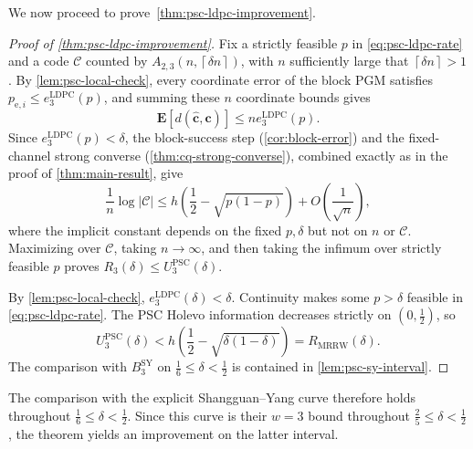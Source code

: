 \documentclass[11pt]{article}
\renewcommand{\leq}{\leqslant}
\theoremstyle{remark}
\newcommand{\cC}{\mathcal{C}}
\newcommand{\Eb}{\mathbf{E}}
\newcommand{\MRRW}{R_{\mathrm{MRRW}}}
\newcommand{\bchat}{\hat{\mathbf{c}}}
\newcommand{\bc}{\mathbf{c}}
\newcommand{\abs}[1]{\left|#1\right|}
\newcommand{\ceil}[1]{\left\lceil #1 \right\rceil}
\newcommand{\PSC}{\mathrm{PSC}}
\begin{document}
We now proceed to prove~\cref{thm:psc-ldpc-improvement}.

\begin{proof}[Proof of \cref{thm:psc-ldpc-improvement}]
Fix a strictly feasible $p$ in \eqref{eq:psc-ldpc-rate} and a code $\cC$ counted by $A_{2,3}(n,\ceil{\delta n})$, with $n$ sufficiently large that $\ceil{\delta n} > 1$. By \cref{lem:psc-local-check}, every coordinate error of the block PGM satisfies $p_{\mathrm{e},i} \leq e_3^{\mathrm{LDPC}}(p)$, and summing these $n$ coordinate bounds gives
\begin{equation*}
\Eb[d(\bchat,\bc)]
\leq n e_3^{\mathrm{LDPC}}(p).
\end{equation*}
Since $e_3^{\mathrm{LDPC}}(p) < \delta$, the block-success step (\cref{cor:block-error}) and the fixed-channel strong converse (\cref{thm:cq-strong-converse}), combined exactly as in the proof of \cref{thm:main-result}, give
\begin{equation*}
\frac{1}{n}\log{\abs{\cC}}
\leq
h\left(\frac{1}{2}-\sqrt{p(1-p)}\right)
+O\left(\frac{1}{\sqrt{n}}\right),
\end{equation*}
where the implicit constant depends on the fixed $p,\delta$ but not on $n$ or $\cC$.
Maximizing over $\cC$, taking $n \to \infty$, and then taking the infimum over strictly feasible $p$ proves $R_3(\delta) \leq U_3^{\PSC}(\delta)$.

By \cref{lem:psc-local-check}, $e_3^{\mathrm{LDPC}}(\delta) < \delta$. Continuity makes some $p > \delta$ feasible in \eqref{eq:psc-ldpc-rate}. The PSC Holevo information decreases strictly on $(0,\frac{1}{2})$, so
\begin{equation*}
U_3^{\PSC}(\delta)
< h\left(\frac{1}{2}-\sqrt{\delta(1-\delta)}\right)
= \MRRW(\delta).
\end{equation*}
The comparison with $B_3^{\mathrm{SY}}$ on $\frac{1}{6} \leq \delta < \frac{1}{2}$ is contained in \cref{lem:psc-sy-interval}.
\end{proof}

The comparison with the explicit Shangguan--Yang curve therefore holds throughout $\frac{1}{6} \leq \delta < \frac{1}{2}$. Since this curve is their $w = 3$ bound throughout $\frac{2}{5} \leq \delta < \frac{1}{2}$, the theorem yields an improvement on the latter interval.
\end{document}
